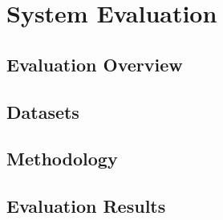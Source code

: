 \section{System Evaluation}
\label{evaluation}

\subsection{Evaluation Overview}
 
\subsection{Datasets}
 
\subsection{Methodology}
 
 
\subsection{Evaluation Results}
 
